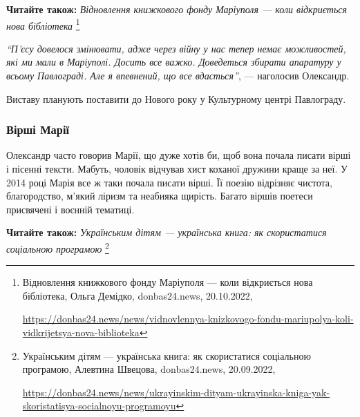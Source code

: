 
\textbf{Читайте також:} \emph{Відновлення книжкового фонду Маріуполя — коли відкриється нова бібліотека}%
\footnote{Відновлення книжкового фонду Маріуполя — коли відкриється нова бібліотека, Ольга Демідко, donbas24.news, 20.10.2022, \par%
\url{https://donbas24.news/news/vidnovlennya-knizkovogo-fondu-mariupolya-koli-vidkrijetsya-nova-biblioteka}%
}

\begin{leftbar}
\emph{\enquote{П'єсу довелося змінювати, адже через війну у нас тепер немає можливостей, які ми мали в Маріуполі. Досить все важко. Доведеться збирати апаратуру у всьому Павлограді. Але я впевнений, що все вдасться}}, — наголосив Олександр.
\end{leftbar}

Виставу планують поставити до Нового року у Культурному центрі Павлограду.

\subsubsection{Вірші Марії}

Олександр часто говорив Марії, що дуже хотів би, щоб вона почала писати вірші і
пісенні тексти. Мабуть, чоловік відчував хист коханої дружини краще за неї. У
2014 році Марія все ж таки почала писати вірші. Її поезію відрізняє чистота,
благородство, м'який ліризм та неабияка щирість. Багато віршів поетеси
присвячені і воєнній тематиці.


\textbf{Читайте також:} \emph{Українським дітям — українська книга: як скористатися соціальною програмою}%
\footnote{Українським дітям — українська книга: як скористатися соціальною програмою, Алевтина Швецова, donbas24.news, 20.09.2022, \par%
\url{https://donbas24.news/news/ukrayinskim-dityam-ukrayinska-kniga-yak-skoristatisya-socialnoyu-programoyu}%
}

